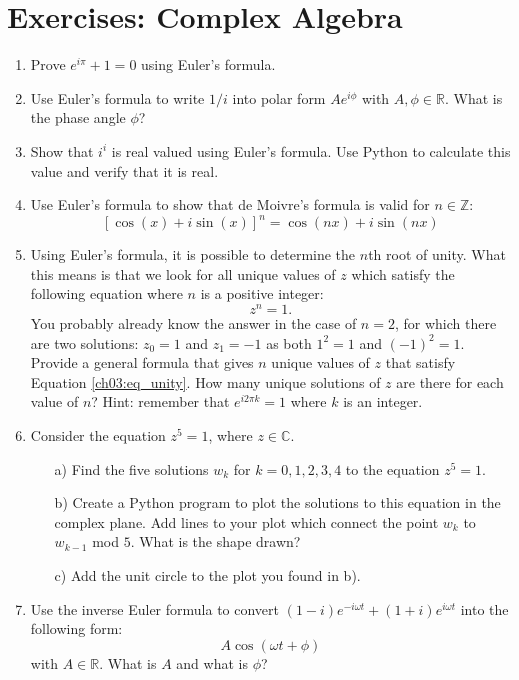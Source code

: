 \newpage
\section{Exercises: Complex Algebra}

\begin{enumerate}
\item Prove $e^{i\pi}+1=0$ using Euler's formula. 
\item Use Euler's formula to write $1/i$ into polar form $Ae^{i\phi}$ with $A,\phi\in\mathbb{R}$. What is the phase angle $\phi$?
\item Show that $i^{i}$ is real valued using Euler's formula. Use Python to calculate this value and verify that it is real. 
\item Use Euler's formula to show that de Moivre's formula is valid for $n\in\mathbb{Z}$:
$$[\cos(x)+i\sin(x)]^{n}=\cos(nx)+i\sin(nx)$$

\item Using Euler's formula, it is possible to determine the $n$th root of unity. What this means is that we look for all unique values of $z$ which satisfy the following equation where $n$ is a positive integer:
\begin{equation}
    z^{n}=1.
    \label{ch03:eq_unity}
\end{equation}
You probably already know the answer in the case of $n=2$, for which there are two solutions: $z_{0}=1$ and $z_{1}=-1$ as both $1^{2}=1$ and $(-1)^{2}=1$. \\
Provide a general formula that gives $n$ unique values of $z$ that
satisfy Equation \ref{ch03:eq_unity}. How many unique solutions of $z$ are there
for each value of $n$? Hint: remember that $e^{i 2\pi k} = 1$ where
$k$ is an integer. 
\item Consider the equation $z^{5}=1$, where $z\in\mathbb{C}$. 
\begin{itemize}
    \item[a)] Find the five solutions $w_{k}$ for $k=0,1,2,3,4$ to the equation $z^{5}=1$. 
    \item[b)] Create a Python program to plot the solutions to this equation in the complex plane. Add lines to your plot which connect the point $w_{k}$ to $w_{k-1}$ mod $5$. What is the shape drawn?
    \item[c)] Add the unit circle to the plot you found in b). 
\end{itemize}

\item Use the inverse Euler formula to convert $(1-i) e^{-i \omega t} + (1+i) e^{i
  \omega t}$ into the following form:
\begin{equation*}
    A \cos(\omega t  + \phi)
\end{equation*}
with $A\in \mathbb{R}$. What is $A$ and what is $\phi$?


\end{enumerate}
